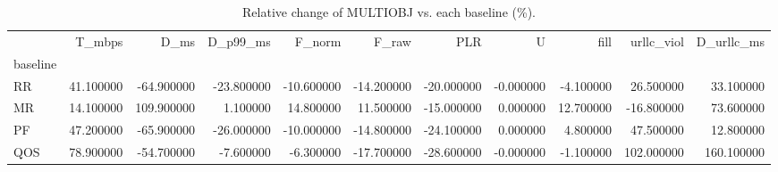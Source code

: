 \begin{table}
\caption{Relative change of MULTIOBJ vs. each baseline (\%).}
\label{tab:pct}
\begin{tabular}{lrrrrrrrrrr}
\toprule
 & T_mbps & D_ms & D_p99_ms & F_norm & F_raw & PLR & U & fill & urllc_viol & D_urllc_ms \\
baseline &  &  &  &  &  &  &  &  &  &  \\
\midrule
RR & 41.100000 & -64.900000 & -23.800000 & -10.600000 & -14.200000 & -20.000000 & -0.000000 & -4.100000 & 26.500000 & 33.100000 \\
MR & 14.100000 & 109.900000 & 1.100000 & 14.800000 & 11.500000 & -15.000000 & 0.000000 & 12.700000 & -16.800000 & 73.600000 \\
PF & 47.200000 & -65.900000 & -26.000000 & -10.000000 & -14.800000 & -24.100000 & 0.000000 & 4.800000 & 47.500000 & 12.800000 \\
QOS & 78.900000 & -54.700000 & -7.600000 & -6.300000 & -17.700000 & -28.600000 & -0.000000 & -1.100000 & 102.000000 & 160.100000 \\
\bottomrule
\end{tabular}
\end{table}
